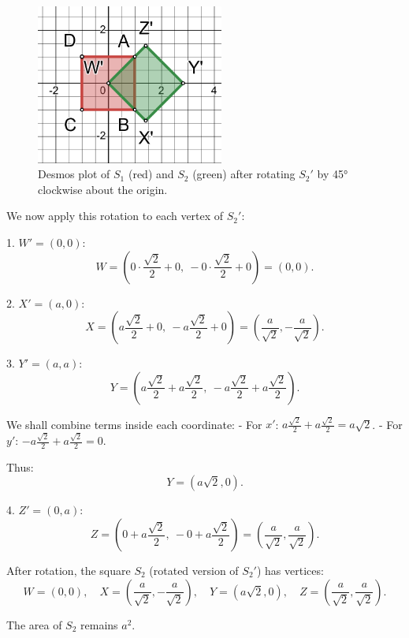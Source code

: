 \documentclass[12pt,a4paper]{article}
\begin{document}
\begin{figure}[h!]
\centering
\includegraphics[width=0.55\textwidth]{desmos_figure.png} %
\caption{Desmos plot of $S_1$ (red) and $S_2$ (green) after rotating $S_2'$ by 45° clockwise about the origin.}
\label{fig:desmos}
\end{figure}

\medskip

We now apply this rotation to each vertex of \( S_2' \):

1. \(W'=(0,0)\):
   \[
   W = \left(0\cdot\frac{\sqrt{2}}{2} + 0,\ -0\cdot\frac{\sqrt{2}}{2}+0\right) = (0,0).
   \]

2. \(X'=(a,0)\):
   \[
   X = \left(a\frac{\sqrt{2}}{2} + 0,\ -a\frac{\sqrt{2}}{2}+0\right) = \left(\frac{a}{\sqrt{2}}, -\frac{a}{\sqrt{2}}\right).
   \]

3. \(Y'=(a,a)\):
   \[
   Y = \left(a\frac{\sqrt{2}}{2} + a\frac{\sqrt{2}}{2},\ -a\frac{\sqrt{2}}{2} + a\frac{\sqrt{2}}{2}\right).
   \]

   We shall combine terms inside each coordinate:
   - For \(x'\): \(a\frac{\sqrt{2}}{2} + a\frac{\sqrt{2}}{2} = a\sqrt{2}\).
   - For \(y'\): \(-a\frac{\sqrt{2}}{2} + a\frac{\sqrt{2}}{2} = 0\).

   Thus:
   \[
   Y = (a\sqrt{2}, 0).
   \]

4. \(Z'=(0,a)\):
   \[
   Z = \left(0 + a\frac{\sqrt{2}}{2},\ -0 + a\frac{\sqrt{2}}{2}\right) = \left(\frac{a}{\sqrt{2}}, \frac{a}{\sqrt{2}}\right).
   \]

After rotation, the square \( S_2 \) (rotated version of \( S_2' \)) has vertices:
\[
W=(0,0), \quad X=\left(\frac{a}{\sqrt{2}}, -\frac{a}{\sqrt{2}}\right), \quad Y=(a\sqrt{2},0), \quad Z=\left(\frac{a}{\sqrt{2}}, \frac{a}{\sqrt{2}}\right).
\]

The area of \( S_2 \) remains \( a^2 \).
\end{document}
